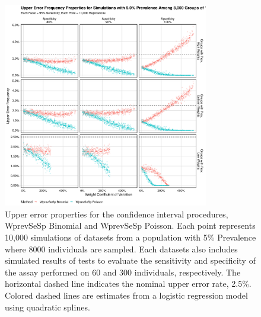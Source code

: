 \documentclass[AMA,STIX1COL]{WileyNJD-v2}
\begin{document}
\begin{figure}
\centering
\includegraphics[width=0.8\textwidth]{figures/imperfect_upper_error_frequency_8000_groups_0_05_prev.pdf}
\caption{Upper error properties for the confidence interval procedures, WprevSeSp Binomial and WprevSeSp Poisson.
Each point represents 10,000 simulations of datasets from a population with 5\% Prevalence where 8000 individuals are sampled.
Each datasets also includes simulated results of tests to evaluate the sensitivity and specificity of the assay performed on 60 and 300 individuals, respectively.
The horizontal dashed line indicates the nominal upper error rate, 2.5\%.
Colored dashed lines are estimates from a logistic regression model using quadratic splines.}
\label{fig:imperfect_upper_error_frequency_8000_groups_0_05_prev}
\end{figure}
\end{document}
